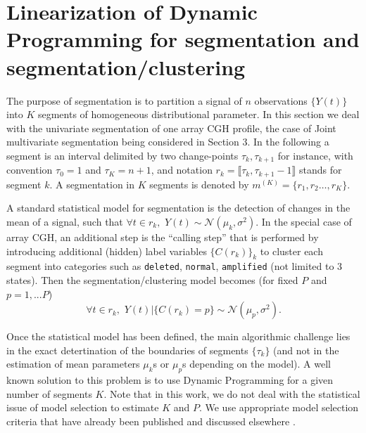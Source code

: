 \documentclass[11pt]{llncs}
\begin{document}
\section{Linearization of Dynamic Programming for segmentation and segmentation/clustering} 

The purpose of segmentation is to partition a signal of $n$ observations $\{Y(t)\}$ into $K$ segments of homogeneous distributional parameter. In this section we deal with the univariate segmentation of one array CGH profile, the case of Joint multivariate segmentation being considered in Section 3. In the following a segment is an interval delimited by two change-points $\tau_k, \tau_{k+1}$ for instance,  with convention $\tau_0 = 1$ and $\tau_K = n+1$, and notation $r_k=\llbracket \tau_k, \tau_{k+1} -1\rrbracket$ stands for segment $k$. A segmentation in $K$ segments is denoted by $m^{(K)} = \{r_1, r_2 \ldots, r_K\}$.

A standard statistical model for segmentation is the detection of changes in the mean of a signal, such that $\forall t \in r_k, \,\, Y(t)\sim \mathcal{N}(\mu_k,\sigma^2).$ In the special case of array CGH, an additional step is the ``calling step'' that is performed by introducing additional (hidden) label variables $\{C(r_k)\}_k$ to cluster each segment into categories such as \texttt{deleted}, \texttt{normal}, \texttt{amplified} (not limited to 3 states). Then the segmentation/clustering model becomes (for fixed $P$ and $p=1,...P$)  $$\forall t \in r_k, \,\, Y(t)|\{C(r_k)=p\} \sim \mathcal{N}(\mu_p,\sigma^2).$$

Once the statistical model has been defined, the main algorithmic challenge lies in the exact detertination of the boundaries of segments $\{\tau_k\}$ (and not in the estimation of mean parameters $\mu_k$s or $\mu_p$s depending on the model). A well known solution to this problem is to use Dynamic Programming for a given number of segments $K$. Note that in this work, we do not deal with the statistical issue of model selection to estimate $K$ and $P$. We use appropriate model selection criteria that have already been published and discussed elsewhere \cite{picard_statistical_2005,ZS07}.
\end{document}
